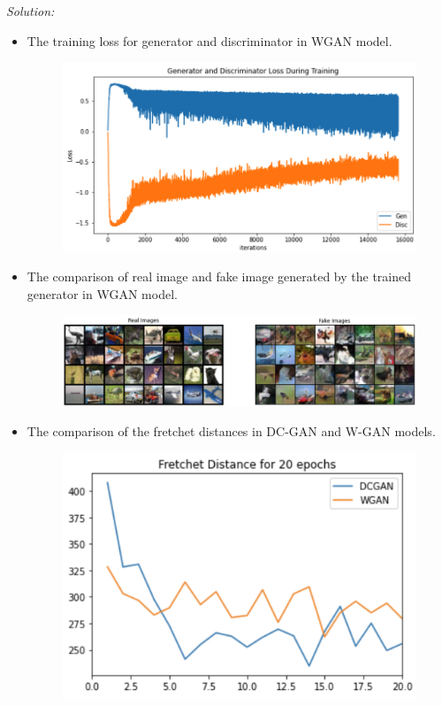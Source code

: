 \documentclass[a4paper, 11pt]{article}
\newenvironment{solution}
    {\textit{Solution:}}
    {}
\begin{document}
\begin{solution}
\begin{itemize}
\item The training loss for generator and discriminator in WGAN model.
\begin{figure}[H]
\centering    \includegraphics[scale=0.5]{W-GAN-loss.png}
    \label{fig:1-4}
\end{figure}

\item The comparison of real image and fake image generated by the trained generator in WGAN model.

\begin{figure}[H]
\centering    \includegraphics[scale=0.43]{DC-GAN-compare.png}
    \label{fig:1-5}
\end{figure}

\item The comparison of the fretchet distances in DC-GAN and W-GAN models.

\begin{figure}[H]
\centering    \includegraphics[scale=0.43]{fd.png}
    \label{fig:1-6}
\end{figure}


\end{itemize}
\end{solution}
\end{document}
